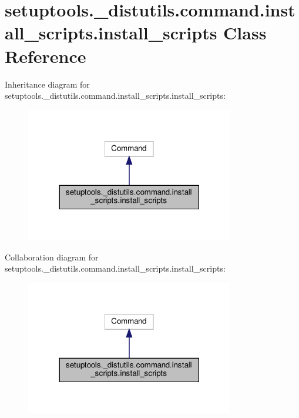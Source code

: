\hypertarget{classsetuptools_1_1__distutils_1_1command_1_1install__scripts_1_1install__scripts}{}\section{setuptools.\+\_\+distutils.\+command.\+install\+\_\+scripts.\+install\+\_\+scripts Class Reference}
\label{classsetuptools_1_1__distutils_1_1command_1_1install__scripts_1_1install__scripts}


Inheritance diagram for setuptools.\+\_\+distutils.\+command.\+install\+\_\+scripts.\+install\+\_\+scripts\+:
\nopagebreak
\begin{figure}[H]
\begin{center}
\leavevmode
\includegraphics[width=258pt]{classsetuptools_1_1__distutils_1_1command_1_1install__scripts_1_1install__scripts__inherit__graph}
\end{center}
\end{figure}


Collaboration diagram for setuptools.\+\_\+distutils.\+command.\+install\+\_\+scripts.\+install\+\_\+scripts\+:
\nopagebreak
\begin{figure}[H]
\begin{center}
\leavevmode
\includegraphics[width=258pt]{classsetuptools_1_1__distutils_1_1command_1_1install__scripts_1_1install__scripts__coll__graph}
\end{center}
\end{figure}
